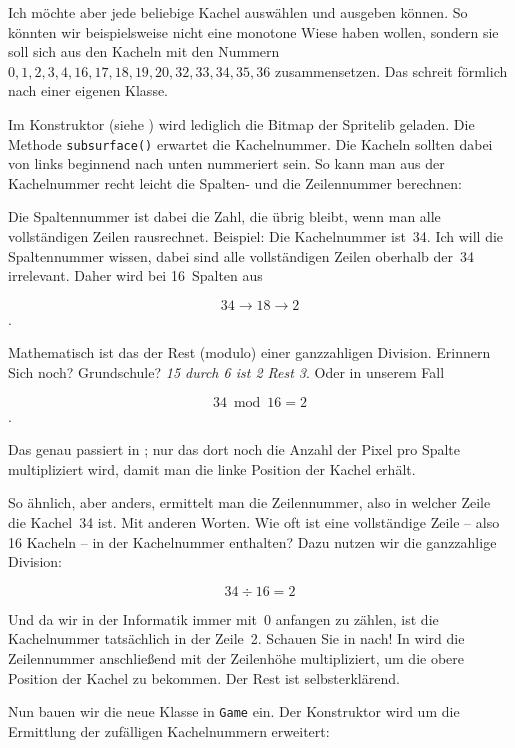 Ich möchte aber jede beliebige Kachel auswählen und ausgeben können. So könnten wir beispielsweise nicht eine monotone Wiese haben wollen, sondern sie soll sich aus den Kacheln mit den Nummern $0, 1, 2, 3, 4, 16, 17, 18, 19, 20, 32, 33, 34, 35, 36$ zusammensetzen. Das schreit förmlich nach einer eigenen Klasse. 

Im Konstruktor (siehe ) wird lediglich die Bitmap der Spritelib geladen. Die Methode \texttt{sub\-sur\-face()} erwartet die Kachelnummer. Die Kacheln sollten dabei von links beginnend nach unten nummeriert sein. So kann man aus der Kachelnummer recht leicht die Spalten- und die Zeilennummer berechnen: 

Die Spaltennummer ist dabei die Zahl, die übrig bleibt, wenn man alle vollständigen Zeilen rausrechnet. Beispiel: Die Kachelnummer ist~34. Ich will die Spaltennummer wissen, dabei sind alle vollständigen Zeilen oberhalb der~34 irrelevant. Daher wird bei 16~Spalten aus 

\[34 \rightarrow 18 \rightarrow 2\].

Mathematisch ist das der Rest (\Gls{modulo}) einer ganzzahligen Division. Erinnern Sich noch? Grundschule? \emph{15 durch 6 ist 2 Rest 3}. Oder in unserem Fall 

\[34 \bmod 16 = 2\].

Das genau passiert in ; nur das dort noch die Anzahl der Pixel pro Spalte multipliziert wird, damit man die linke Position der Kachel erhält.

So ähnlich, aber anders, ermittelt man die Zeilennummer, also in welcher Zeile die Kachel~34 ist. Mit anderen Worten. Wie oft ist eine vollständige Zeile -- also 16 Kacheln -- in der Kachelnummer enthalten? Dazu nutzen wir die ganzzahlige Division:

\[34 \div 16 = 2\]

Und da wir in der Informatik immer mit~0 anfangen zu zählen, ist die Kachelnummer tatsächlich in der Zeile~2. Schauen Sie in  nach! In  wird die Zeilennummer anschließend mit der Zeilenhöhe multipliziert, um die obere Position der Kachel zu bekommen. Der Rest ist selbsterklärend.


Nun bauen wir die neue Klasse in \texttt{Game} ein. Der Konstruktor wird um die Ermittlung der zufälligen Kachelnummern erweitert:

